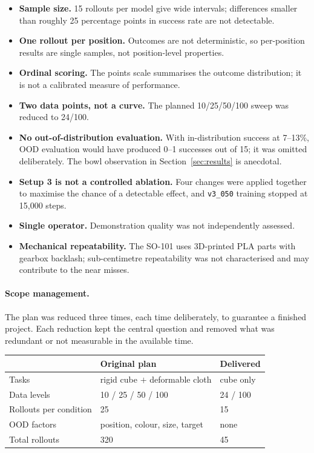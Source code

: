 \documentclass[11pt,a4paper]{article}
\begin{document}
\begin{itemize}
  \item \textbf{Sample size.} 15 rollouts per model give wide intervals;
        differences smaller than roughly 25 percentage points in success rate
        are not detectable.
  \item \textbf{One rollout per position.} Outcomes are not deterministic, so
        per-position results are single samples, not position-level
        properties.
  \item \textbf{Ordinal scoring.} The points scale summarises the outcome
        distribution; it is not a calibrated measure of performance.
  \item \textbf{Two data points, not a curve.} The planned 10/25/50/100 sweep
        was reduced to 24/100.
  \item \textbf{No out-of-distribution evaluation.} With in-distribution
        success at 7--13\%, OOD evaluation would have produced 0--1 successes
        out of 15; it was omitted deliberately. The bowl observation in
        Section~\ref{sec:results} is anecdotal.
  \item \textbf{Setup 3 is not a controlled ablation.} Four changes were
        applied together to maximise the chance of a detectable effect, and
        \texttt{v3\_050} training stopped at 15{,}000 steps.
  \item \textbf{Single operator.} Demonstration quality was not independently
        assessed.
  \item \textbf{Mechanical repeatability.} The SO-101 uses 3D-printed PLA parts
        with gearbox backlash; sub-centimetre repeatability was not
        characterised and may contribute to the near misses.
\end{itemize}

\paragraph{Scope management.} The plan was reduced three times, each time
deliberately, to guarantee a finished project. Each reduction kept the central
question and removed what was redundant or not measurable in the available
time.

\begin{center}
\small
\begin{tabular}{@{}lll@{}}
\toprule
 & \textbf{Original plan} & \textbf{Delivered} \\
\midrule
Tasks & rigid cube $+$ deformable cloth & cube only \\
Data levels & 10 / 25 / 50 / 100 & 24 / 100 \\
Rollouts per condition & 25 & 15 \\
OOD factors & position, colour, size, target & none \\
Total rollouts & 320 & 45 \\
\bottomrule
\end{tabular}
\end{center}
\end{document}
